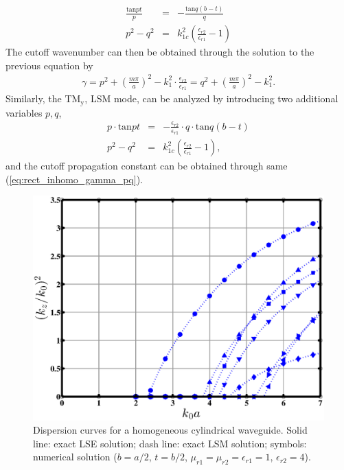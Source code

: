 \documentclass{pj}
\begin{document}
\begin{eqnarray}
\frac{\mathrm{tan} pt}{p} &=& - \frac{\mathrm{tan} q(b-t)}{q} \nonumber \\
p^2-q^2 &=& k_{1c}^2 \left( \frac{\epsilon_{r2}}{\epsilon_{r1}} - 1\right)
\end{eqnarray}
The cutoff wavenumber can then be obtained through the solution to the previous equation by
\begin{eqnarray}
\gamma = p^2 + \left(\frac{m\pi}{a}\right)^2 - k_1^2\cdot\frac{\epsilon_{r2}}{\epsilon_{r1}} = q^2 + \left(\frac{m\pi}{a}\right)^2 - k_1^2
\label{eq:rect_inhomo_gamma_pq}.
\end{eqnarray}
%
%
Similarly, the $\mathrm{TM_{y}}$, LSM mode, can be analyzed by introducing two additional variables $p,q$, 
\begin{eqnarray}
p\cdot\mathrm{tan} pt &=& - \frac{\epsilon_{r2}}{\epsilon_{r1}}\cdot q\cdot\mathrm{tan} q(b-t) \nonumber \\
p^2-q^2 &=& k_{1c}^2 \left(\frac{\epsilon_{r2}}{\epsilon_{r1}} - 1\right),
\end{eqnarray}
and the cutoff propagation constant can be obtained through same (\ref{eq:rect_inhomo_gamma_pq}).

\begin{figure}[htbp]
	\centering
	\includegraphics[width=\defaultfigurewidth]{./img/rectangular_inhomo/dispersion.eps}
	\caption{Dispersion curves for a homogeneous cylindrical waveguide. Solid line: exact LSE solution; dash line: exact LSM solution; symbols: numerical solution ($b=a/2$, $t=b/2$, $\mu_{r1}=\mu_{r2}=\epsilon_{r1} = 1$, $\epsilon_{r2} = 4$).}
	\label{fig:rect_inhomo_dispersion}
\end{figure}
\end{document}
